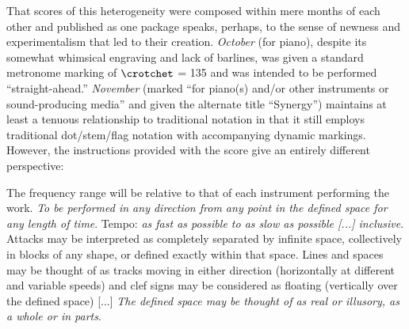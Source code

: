     That scores of this heterogeneity were composed within mere months of each other and published as one package speaks, perhaps, to the sense of newness and experimentalism that led to their creation. \textit{October} (for piano), despite its somewhat whimsical engraving and lack of barlines, was given a standard metronome marking of $\crotchet$ = 135 and was intended to be performed ``straight-ahead.'' \textit{November} (marked ``for piano(s) and/or other instruments or sound-producing media'' and given the alternate title ``Synergy'') maintains at least a tenuous relationship to traditional notation in that it still employs traditional dot/stem/flag notation with accompanying dynamic markings. However, the instructions provided with the score give an entirely different perspective:

    \begin{smallquote}
    The frequency range will be relative to that of each instrument performing the work. \textit{To be performed in any direction from any point in the defined space for any length of time}. Tempo:\textit{ as fast as possible to as slow as possible [...] inclusive}. Attacks may be interpreted as completely separated by infinite space, collectively in blocks of any shape, or defined exactly within that space. Lines and spaces may be thought of as tracks moving in either direction (horizontally at different and variable speeds) and clef signs may be considered as floating (vertically over the defined space) [...]\textit{ The defined space may be thought of as real or illusory, as a whole or in parts}.\autocite[1]{Brown_1986}
    \end{smallquote}

